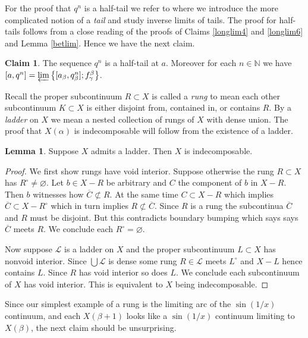 \documentclass[12pt]{article}
\theoremstyle{plain}
\theoremstyle{definition}
\newtheorem{lemma}[theorem]{Lemma}
\newcounter{claim5counter}
\newtheorem{claim5}[claim5counter]{Claim}
\newcommand{\A}{\ensuremath{\alpha}}
\newcommand{\B}{\ensuremath{\beta}}
\newcommand{\G}{\ensuremath{\gamma}}
\newcommand{\NN}{\ensuremath{\mathbb N}}
\newcommand{\0}{\ensuremath{\varnothing}}
\newcommand{\cL}{\ensuremath{\mathcal L}}
\begin{document}
	For the proof that $q^n$ is a half-tail we refer to \cite{Me4} where we introduce the more complicated notion of a \textit{tail} and study inverse limits of tails. The proof for half-tails follows from a close reading of the proofs of \cite{Me4} Claims \ref{longlim4} and \ref{longlim6} and Lemma \ref{betlim}. Hence we have the next claim.
	
	
	\begin{claim5}\label{Lht}
		The sequence $\displaystyle q^n$ is a half-tail at $a$. Moreover for each $n \in \NN$ we have $[a,q^n] = \varprojlim \big \{[a_\B,q^n_\B] ; f^\B_\G \big \}$.
	\end{claim5}
	
	Recall the proper subcontinuum $R \subset X$ is called a \textit{rung} to mean each other subcontinuum $K \subset X$ 
	is either disjoint from, contained in, or contains $R$. By a \textit{ladder} on $X$ we mean a nested collection of rungs of $X$ with dense union.
	The proof that $X(\A)$ is indecomposable will follow from the existence of a ladder. 
	
	
	\begin{lemma}\label{5thm3}
		Suppose $X$ admits a ladder.
		Then $X$ is indecomposable.
	\end{lemma}
	
	\begin{proof}
		
		We first show rungs have void interior.
		Suppose otherwise the rung $R \subset X$ has $R^\circ \ne \0$.
		Let $b \in X-R$ be arbitrary and $C$ the component of $b$ in $X-R$.
		Then $b$ witnesses how $\overline C \not \subset R$.
		At the same time $C \subset X-R$ which implies $ \overline C \subset X - R^\circ $ which in turn implies $R \not \subset \overline C$.
		Since $R$ is a rung the subcontinua $\overline C$ and $R$ must be disjoint.
		But this contradicts boundary bumping which says says $\overline{C}$ meets $R$.
		We conclude each $R^\circ = \0$.
		
		Now suppose $\cL$ is a ladder on $X$
		and the proper subcontinuum $L \subset X$ has nonvoid interior.
		Since $\bigcup \cL$ is dense some rung $R \in \cL$ meets $L^\circ$ and $X-L$ hence contains $L$.
		Since $R$ has void interior so does $L$.
		We conclude each subcontinuum of $X$ has void interior.
		This is equivalent to $X$ being indecomposable.
	\end{proof}
	
	Since our simplest example of a rung is the limiting arc of the $\sin(1/x)$ continuum, and each $X(\B+1)$ looks like a $\sin(1/x)$ continuum limiting to $X(\B)$, the next claim should be unsurprising. 
	
\end{document}
